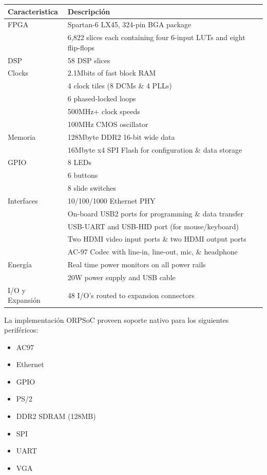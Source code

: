 				\begin{tabular}{ p{4cm} p{10cm} }
				\rowcolor[gray]{0.8} Caracteristica & Descripción \\		
				\hline FPGA   & Spartan-6 LX45, 324-pin BGA package \\
				\hline 		  &	6,822 slices each containing four 6-input LUTs and eight flip-flops\\
				\hline DSP	  & 58 DSP slices\\
				\hline Clocks & 2.1Mbits of fast block RAM\\
				\hline 		  & 4 clock tiles (8 DCMs \& 4 PLLs)\\
				\hline 		  & 6 phased-locked loops\\
				\hline 		  & 500MHz+ clock speeds\\
				\hline 		  & 100MHz CMOS oscillator\\
				\hline Memoria & 128Mbyte DDR2 16-bit wide data\\
				\hline         & 16Mbyte x4 SPI Flash for configuration \& data storage\\
				\hline GPIO & 8 LEDs \\
				\hline 		& 6 buttons\\
				\hline		& 8 slide switches\\
				\hline Interfaces & 10/100/1000 Ethernet PHY\\
				\hline 			  & On-board USB2 ports for programming \& data transfer\\
				\hline 			  & USB-UART and USB-HID port (for mouse/keyboard)\\
				\hline 			  & Two HDMI video input ports \& two HDMI output ports\\
				\hline			  & AC-97 Codec with line-in, line-out, mic, \& headphone\\
				\hline Energía & Real time power monitors on all power rails\\
				\hline 		   & 20W power supply and USB cable\\
				\hline I/O y Expansión & 48 I/O’s routed to expansion connectors\\
				\end{tabular}
				
				La implementación ORPSoC proveen soporte nativo para los siguientes periféricos:
				
				\begin{itemize}
				  \item AC97
				  \item Ethernet
				  \item GPIO
				  \item PS/2 
				  \item DDR2 SDRAM (128MB)
				  \item SPI
				  \item UART
				  \item VGA
				\end{itemize}				

